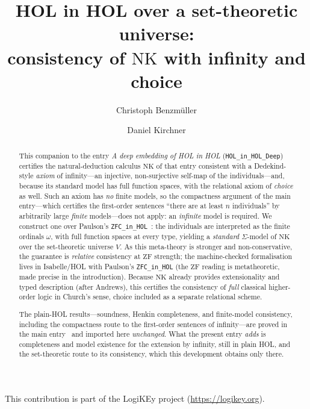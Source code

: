 \documentclass[11pt,a4paper]{article}
\begin{document}
\title{HOL in HOL over a set-theoretic universe:\\
  consistency of $\mathrm{NK}$ with infinity and choice}
\author{Christoph Benzm\"uller \and Daniel Kirchner}
\maketitle
\begin{abstract}
This companion to the entry \emph{A deep embedding of HOL in HOL}
(\texttt{HOL\_in\_HOL\_Deep})~\cite{HOLinHOLDeep} certifies the
natural-deduction calculus $\mathrm{NK}$ of that entry consistent with a
Dedekind-style \emph{axiom} of infinity---an injective,
non-surjective self-map of the individuals---and, because its standard model
has full function spaces, with the relational axiom of \emph{choice} as
well.  Such an axiom has \emph{no} finite models, so the compactness
argument of the main entry---which certifies the first-order sentences
``there are at least $n$ individuals'' by arbitrarily large \emph{finite}
models---does not apply: an \emph{infinite} model is required.  We construct one over Paulson's
\texttt{ZFC\_in\_HOL}~\cite{ZFCinHOL}: the individuals are interpreted as the
finite ordinals $\omega$, with full function spaces at every type, yielding a
\emph{standard} $\Sigma$-model of $\mathrm{NK}$ over the set-theoretic
universe $V$.  As this meta-theory is stronger and non-conservative, the
guarantee is \emph{relative} consistency at $\mathrm{ZF}$ strength; the
machine-checked formalisation lives in Isabelle/HOL with Paulson's
\texttt{ZFC\_in\_HOL} (the $\mathrm{ZF}$ reading is metatheoretic, made
precise in the introduction).  Because $\mathrm{NK}$ already provides
extensionality and typed description (after Andrews), this certifies the
consistency of \emph{full} classical higher-order logic in Church's
sense, choice included as a separate relational scheme.

The plain-HOL results---soundness, Henkin completeness, and
finite-model consistency, including the compactness route to the
first-order sentences of infinity---are proved in the main entry~\cite{HOLinHOLDeep} and
imported here \emph{unchanged}.  What the present entry \emph{adds} is
completeness and model existence for the extension by infinity, still
in plain HOL, and the set-theoretic route to its consistency, which this
development obtains only there.
\end{abstract}

\medskip\noindent
This contribution is part of the LogiKEy project
(\url{https://logikey.org}).
\end{document}
